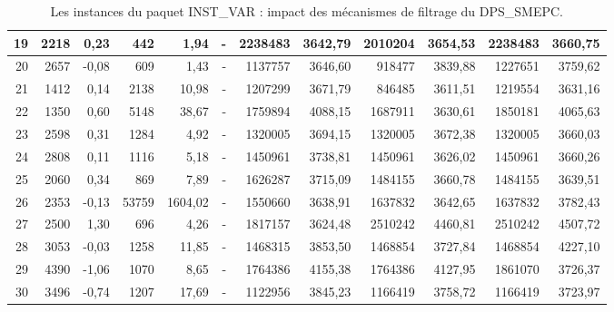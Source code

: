\begin{table}[H]
\begin{tabular}{|r|rrrr|rrr|rr|rr|}
	19	&	2218	&	0,23	&	442	&	1,94	&	-	&	2238483	&	3642,79	&	2010204	&	3654,53	&	2238483	&	3660,75	\\ \hline
	20	&	2657	&	-0,08	&	609	&	1,43	&	-	&	1137757	&	3646,60	&	918477	&	3839,88	&	1227651	&	3759,62	\\ \hline
	21	&	1412	&	0,14	&	2138	&	10,98	&	-	&	1207299	&	3671,79	&	846485	&	3611,51	&	1219554	&	3631,16	\\ \hline
	22	&	1350	&	0,60	&	5148	&	38,67	&	-	&	1759894	&	4088,15	&	1687911	&	3630,61	&	1850181	&	4065,63	\\ \hline
	23	&	2598	&	0,31	&	1284	&	4,92	&	-	&	1320005	&	3694,15	&	1320005	&	3672,38	&	1320005	&	3660,03	\\ \hline
	24	&	2808	&	0,11	&	1116	&	5,18	&	-	&	1450961	&	3738,81	&	1450961	&	3626,02	&	1450961	&	3660,26	\\ \hline
	25	&	2060	&	0,34	&	869	&	7,89	&	-	&	1626287	&	3715,09	&	1484155	&	3660,78	&	1484155	&	3639,51	\\ \hline
	26	&	2353	&	-0,13	&	53759	&	1604,02	&	-	&	1550660	&	3638,91	&	1637832	&	3642,65	&	1637832	&	3782,43	\\ \hline
	27	&	2500	&	1,30	&	696	&	4,26	&	-	&	1817157	&	3624,48	&	2510242	&	4460,81	&	2510242	&	4507,72	\\ \hline
	28	&	3053	&	-0,03	&	1258	&	11,85	&	-	&	1468315	&	3853,50	&	1468854	&	3727,84	&	1468854	&	4227,10	\\ \hline
	29	&	4390	&	-1,06	&	1070	&	8,65	&	-	&	1764386	&	4155,38	&	1764386	&	4127,95	&	1861070	&	3726,37	\\ \hline
	30	&	3496	&	-0,74	&	1207	&	17,69	&	-	&	1122956	&	3845,23	&	1166419	&	3758,72	&	1166419	&	3723,97	\\ \hline
		\bottomrule
	\end{tabular}%
	\caption{Les instances du paquet INST\_VAR : impact des mécanismes de filtrage du DPS\_SMEPC.}
	\label{power_filter}%
\end{table}%

